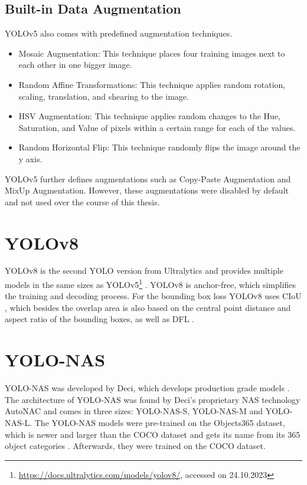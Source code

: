 \documentclass[10pt]{book}
\begin{document}
\subsection{Built-in Data Augmentation}

\ac{YOLO}v5 also comes with predefined augmentation techniques. 

\begin{itemize}
  \item Mosaic Augmentation: This technique places four training images next to each other in one bigger image.
  \item Random Affine Transformations: This technique applies random rotation, scaling, translation, and shearing to the image.
  \item HSV Augmentation: This technique applies random changes to the Hue, Saturation, and Value of pixels within a certain range for each of the values.
  \item Random Horizontal Flip: This technique randomly flips the image around the y axis.
\end{itemize}

\ac{YOLO}v5 further defines augmentations such as Copy-Paste Augmentation and MixUp Augmentation. However, these augmentations were disabled by default and not used over the course of this thesis.

\section{YOLOv8}

\ac{YOLO}v8 is the second \ac{YOLO} version from Ultralytics and provides multiple models in the same sizes as \ac{YOLO}v5\footnote{\url{https://docs.ultralytics.com/models/yolov8/}, accessed on 24.10.2023} \cite{terven2023comprehensive}. \ac{YOLO}v8 is anchor-free, which simplifies the training and decoding process. For the bounding box loss \ac{YOLO}v8 uses \ac{CIoU} \cite{zheng2020distance}, which besides the overlap area is also based on the central point distance and aspect ratio of the bounding boxes, as well as \ac{DFL} \cite{li2020generalized}. %

\section{YOLO-NAS}

\ac{YOLO}-NAS was developed by Deci, which develops production grade models \cite{terven2023comprehensive}. The architecture of \ac{YOLO}-NAS was found by Deci's proprietary \ac{NAS} technology AutoNAC and comes in three sizes: \ac{YOLO}-NAS-S, \ac{YOLO}-NAS-M and \ac{YOLO}-NAS-L. The \ac{YOLO}-NAS models were pre-trained on the Objects365 dataset, which is newer and larger than the \ac{COCO} dataset and gets its name from its 365 object categories \cite{shao2019objects365}. Afterwards, they were trained on the \ac{COCO} dataset.
\end{document}
